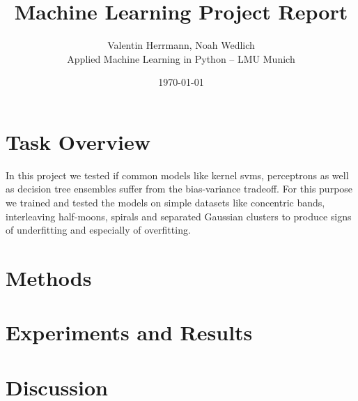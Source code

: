 \documentclass[11pt]{article}
\title{\textbf{Machine Learning Project Report}}
\author{Valentin Herrmann, Noah Wedlich \\
Applied Machine Learning in Python – LMU Munich}
\date{\today}
\begin{document}

\maketitle

\section{Task Overview}

In this project we tested if common models like kernel svms, perceptrons as well as decision tree ensembles suffer from the bias-variance tradeoff. For this purpose we trained and tested the models on simple datasets like concentric bands, interleaving half-moons, spirals and separated Gaussian clusters to produce signs of underfitting and especially of overfitting.

\section{Methods}



\section{Experiments and Results}



\section{Discussion}
\end{document}
